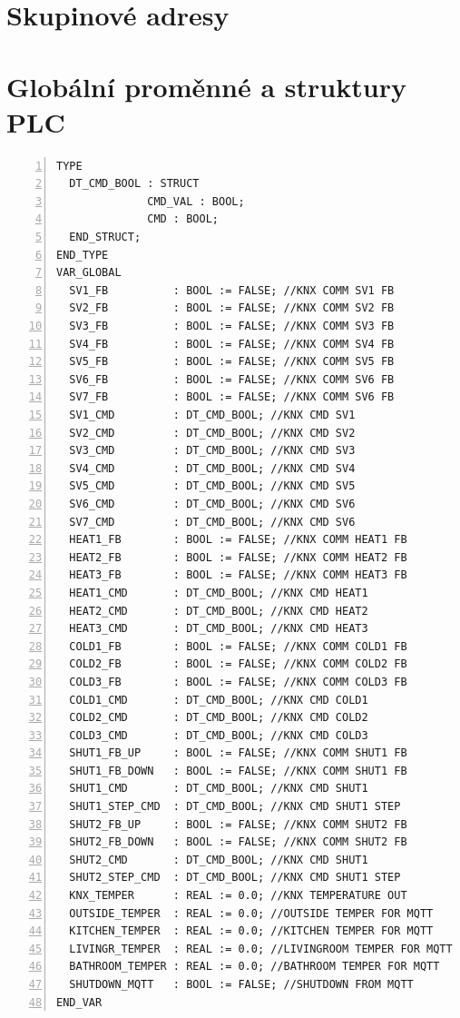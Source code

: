 \chapter{Skupinové adresy}
\label{apend:skupinove_adresy}




\chapter{Globální proměnné a struktury PLC}
\label{apend:globalni_promenne}
\begin{lstlisting}[language=ST, breaklines=true, numbers=left, numberstyle=\small, numbersep=10pt, frame=single, basicstyle=\ttfamily\small, caption={Globální proměnné a struktury PLC}, label={lst:globalni_promenne}]
TYPE
  DT_CMD_BOOL : STRUCT
              CMD_VAL : BOOL;
              CMD : BOOL;
  END_STRUCT;
END_TYPE
VAR_GLOBAL
  SV1_FB          : BOOL := FALSE; //KNX COMM SV1 FB
  SV2_FB          : BOOL := FALSE; //KNX COMM SV2 FB
  SV3_FB          : BOOL := FALSE; //KNX COMM SV3 FB
  SV4_FB          : BOOL := FALSE; //KNX COMM SV4 FB
  SV5_FB          : BOOL := FALSE; //KNX COMM SV5 FB
  SV6_FB          : BOOL := FALSE; //KNX COMM SV6 FB
  SV7_FB          : BOOL := FALSE; //KNX COMM SV6 FB
  SV1_CMD         : DT_CMD_BOOL; //KNX CMD SV1
  SV2_CMD         : DT_CMD_BOOL; //KNX CMD SV2
  SV3_CMD         : DT_CMD_BOOL; //KNX CMD SV3
  SV4_CMD         : DT_CMD_BOOL; //KNX CMD SV4
  SV5_CMD         : DT_CMD_BOOL; //KNX CMD SV5
  SV6_CMD         : DT_CMD_BOOL; //KNX CMD SV6
  SV7_CMD         : DT_CMD_BOOL; //KNX CMD SV6
  HEAT1_FB        : BOOL := FALSE; //KNX COMM HEAT1 FB
  HEAT2_FB        : BOOL := FALSE; //KNX COMM HEAT2 FB
  HEAT3_FB        : BOOL := FALSE; //KNX COMM HEAT3 FB
  HEAT1_CMD       : DT_CMD_BOOL; //KNX CMD HEAT1
  HEAT2_CMD       : DT_CMD_BOOL; //KNX CMD HEAT2
  HEAT3_CMD       : DT_CMD_BOOL; //KNX CMD HEAT3
  COLD1_FB        : BOOL := FALSE; //KNX COMM COLD1 FB
  COLD2_FB        : BOOL := FALSE; //KNX COMM COLD2 FB
  COLD3_FB        : BOOL := FALSE; //KNX COMM COLD3 FB
  COLD1_CMD       : DT_CMD_BOOL; //KNX CMD COLD1
  COLD2_CMD       : DT_CMD_BOOL; //KNX CMD COLD2
  COLD3_CMD       : DT_CMD_BOOL; //KNX CMD COLD3
  SHUT1_FB_UP     : BOOL := FALSE; //KNX COMM SHUT1 FB
  SHUT1_FB_DOWN   : BOOL := FALSE; //KNX COMM SHUT1 FB
  SHUT1_CMD       : DT_CMD_BOOL; //KNX CMD SHUT1
  SHUT1_STEP_CMD  : DT_CMD_BOOL; //KNX CMD SHUT1 STEP
  SHUT2_FB_UP     : BOOL := FALSE; //KNX COMM SHUT2 FB
  SHUT2_FB_DOWN   : BOOL := FALSE; //KNX COMM SHUT2 FB
  SHUT2_CMD       : DT_CMD_BOOL; //KNX CMD SHUT1
  SHUT2_STEP_CMD  : DT_CMD_BOOL; //KNX CMD SHUT1 STEP
  KNX_TEMPER      : REAL := 0.0; //KNX TEMPERATURE OUT
  OUTSIDE_TEMPER  : REAL := 0.0; //OUTSIDE TEMPER FOR MQTT
  KITCHEN_TEMPER  : REAL := 0.0; //KITCHEN TEMPER FOR MQTT
  LIVINGR_TEMPER  : REAL := 0.0; //LIVINGROOM TEMPER FOR MQTT
  BATHROOM_TEMPER : REAL := 0.0; //BATHROOM TEMPER FOR MQTT
  SHUTDOWN_MQTT   : BOOL := FALSE; //SHUTDOWN FROM MQTT
END_VAR
\end{lstlisting}
